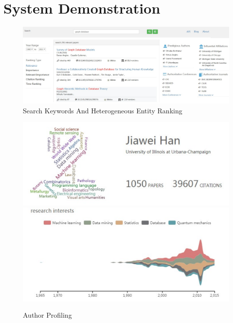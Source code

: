 \section{System Demonstration}
\label{sec-demo}

\begin{figure}[tp]
\centering
\includegraphics[width=\textwidth]{searchKeywords.pdf}
\caption{Search Keywords And Heterogeneous Entity Ranking}
\label{fig:searchKeywords}
\vspace{-3ex}
\end{figure}

\begin{figure}
\centering
\includegraphics[width=\columnwidth]{hjwAvatar.pdf}
\includegraphics[width=\columnwidth]{hjwInterest.pdf}
\caption{Author Profiling}
\label{fig:hjwProfile}
\vspace{-3ex}
\end{figure}


